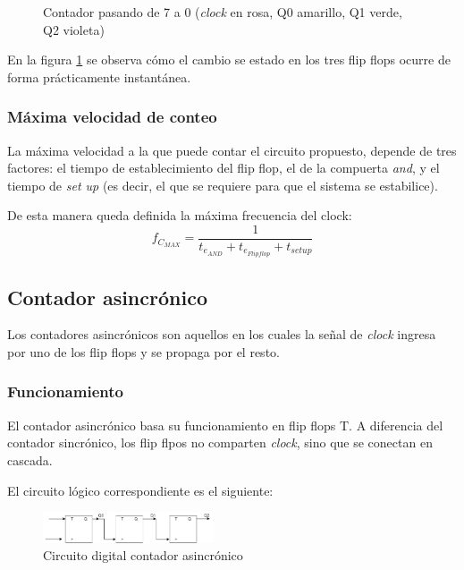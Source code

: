 \documentclass[../../e3_tp2_main.tex]{subfiles}
\begin{document}
\begin{figure}[H]	
	\centering
	\caption{Contador pasando de 7 a 0 (\textit{clock} en rosa, Q0 amarillo, Q1 verde, Q2 violeta)} \label{fig:s1t0}
\end{figure}

En la figura \ref{fig:s1t0} se observa c\'omo el cambio se estado en los tres flip flops ocurre de forma pr\'acticamente instant\'anea.

\subsubsection{Máxima velocidad de conteo}
La máxima velocidad a la que puede contar el circuito propuesto, depende de tres factores: el tiempo de establecimiento del flip flop, el de la compuerta \textit{and}, y el tiempo de \textit{set up} (es decir, el que se requiere para que el sistema se estabilice).
\par De esta manera queda definida la máxima frecuencia del clock:
$$f_{C_{MAX}}=\frac{1}{t_{e_{AND}} +t_{e_{Flipflop}} +t_{setup}   } $$

\subsection{Contador asincr\'onico}
Los contadores asincrónicos son aquellos en los cuales la señal de \textit{clock} ingresa por uno de los flip flops y se propaga por el resto.

\subsubsection{Funcionamiento}

El contador asincrónico basa su funcionamiento en flip flops T. A diferencia del contador sincr\'onico, los flip flpos no comparten \textit{clock}, sino que se conectan en cascada. 
\par El circuito lógico correspondiente es el siguiente:


\begin{figure}[H]	
	\centering
	\includegraphics[width=0.45\textwidth]{imagenes/cas_b.png}
	\caption{Circuito digital contador asincr\'onico}\label{fig:case}
\end{figure}
\end{document}
